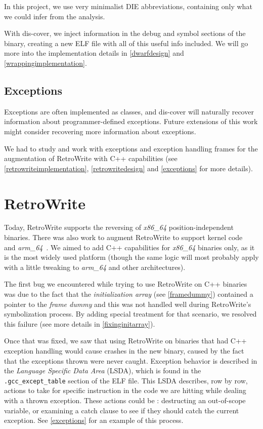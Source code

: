 \documentclass[a4paper,11pt,oneside]{report}
\begin{document}
In this project, we use very minimalist DIE abbreviations, containing only
what we could infer from the analysis.

With dis-cover, we inject information in the debug and symbol sections of the
binary, creating a new ELF file with all of this useful info included.
We will go more into the implementation details in \autoref{dwarfdesign} and
\autoref{wrappingimplementation}.

\subsection{Exceptions}

Exceptions are often implemented as classes, and dis-cover will naturally 
recover information about programmer-defined exceptions.
Future extensions of this work might consider recovering more information about 
exceptions.

We had to study and work with exceptions and exception handling frames for 
the augmentation of RetroWrite with C++ capabilities
(see \autoref{retrowriteimplementation}, \autoref{retrowritedesign} and
\autoref{exceptions} for more details).


\section{RetroWrite}
\label{retrowritedesign}

Today, RetroWrite supports the reversing of \emph{x86\_64}
position-independent binaries.
There was also work to augment RetroWrite to support kernel 
code~\cite{rwkernel} and \emph{arm\_64}~\cite{rwarm}.
We aimed to add C++ capabilities for \emph{x86\_64} binaries only, as it is
the most widely used platform (though the same logic will most probably apply
with a little tweaking to \emph{arm\_64} and other architectures).

The first bug we encountered while trying to use RetroWrite on C++ binaries
was due to the fact that the \emph{initialization array} (see
\autoref{framedummy}) contained a pointer to the \emph{frame dummy} and this
was not handled well during RetroWrite's symbolization process.
By adding special treatment for that scenario, we resolved this failure (see
more details in \autoref{fixinginitarray}).

Once that was fixed, we saw that using RetroWrite on binaries that had C++
exception handling would cause crashes in the new binary, caused by the fact
that the exceptions thrown were never caught.
Exception behavior is described in the \emph{Language Specific Data Area}
(LSDA), which is found in the \texttt{.gcc\_except\_table} section of the ELF
file.
This LSDA describes, row by row, actions to take for specific instruction in
the code we are hitting while dealing with a thrown exception. These actions
could be : destructing an out-of-scope variable, or examining a catch clause
to see if they should catch the current exception. See \autoref{exceptions}
for an example of this process.
\end{document}
